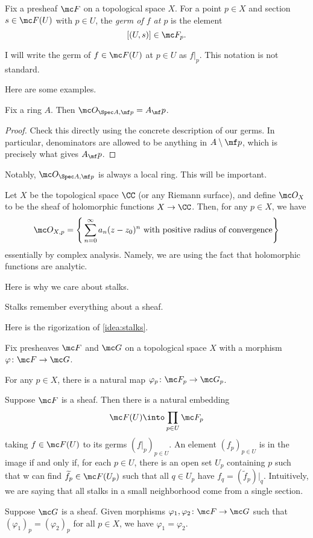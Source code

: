 \documentclass[../notes.tex]{subfiles}
\begin{document}
\begin{definition}[Germ]
	Fix a presheaf $\mc F$ on a topological space $X$. For a point $p\in X$ and section $s\in\mc F(U)$ with $p\in U$, the \textit{germ of $f$ at $p$} is the element
	\[[(U,s)]\in\mc F_p.\]
\end{definition}
\begin{notation}
	I will write the germ of $f\in\mc F(U)$ at $p\in U$ as $f|_p$. This notation is not standard.
\end{notation}
Here are some examples.
\begin{lemma}
	Fix a ring $A$. Then $\mc O_{\Spec A,\mf p}=A_\mf p$.
\end{lemma}
\begin{proof}
	Check this directly using the concrete description of our germs. In particular, denominators are allowed to be anything in $A\setminus\mf p$, which is precisely what gives $A_\mf p$.
\end{proof}
Notably, $\mc O_{\Spec A,\mf p}$ is always a local ring. This will be important.
\begin{example}
	Let $X$ be the topological space $\CC$ (or any Riemann surface), and define $\mc O_X$ to be the sheaf of holomorphic functions $X\to\CC$. Then, for any $p\in X$, we have
	\[\mc O_{X,p}=\Bigg\{\sum_{n=0}^\infty a_n(z-z_0)^n\text{ with positive radius of convergence}\Bigg\}\]
	essentially by complex analysis. Namely, we are using the fact that holomorphic functions are analytic.
\end{example}
Here is why we care about stalks.
\begin{idea} \label{idea:stalks}
	Stalks remember everything about a sheaf.
\end{idea}
Here is the rigorization of \autoref{idea:stalks}.
\begin{proposition}
	Fix presheaves $\mc F$ and $\mc G$ on a topological space $X$ with a morphism $\varphi\colon\mc F\to\mc G$.
	\begin{listalph}
		\item For any $p\in X$, there is a natural map $\varphi_p\colon\mc F_p\to\mc G_p$.
		\item Suppose $\mc F$ is a sheaf. Then there is a natural embedding
		\[\mc F(U)\into\prod_{p\in U}\mc F_p\]
		taking $f\in\mc F(U)$ to its germs $(f|_p)_{p\in U}$. An element $(f_p)_{p\in U}$ is in the image if and only if, for each $p\in U$, there is an open set $U_p$ containing $p$ such that w can find $\widetilde f_p\in\mc F(U_p)$ such that all $q\in U_p$ have $f_q=(\widetilde f_p)|_q$. Intuitively, we are saying that all stalks in a small neighborhood come from a single section.
		\item Suppose $\mc G$ is a sheaf. Given morphisms $\varphi_1,\varphi_2\colon\mc F\to\mc G$ such that $(\varphi_1)_p=(\varphi_2)_p$ for all $p\in X$, we have $\varphi_1=\varphi_2$.
	\end{listalph}
\end{proposition}
\end{document}
